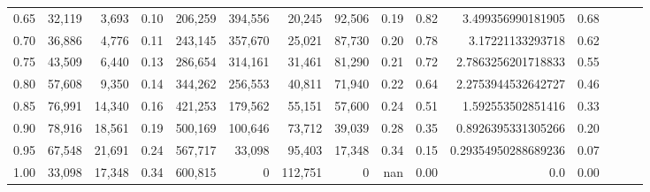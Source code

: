 \begin{tabular}{rrrrrrrrrrrrrrr}
0.65 &  32,119 &   3,693 &  0.10 &  206,259 &  394,556 &   20,245 &   92,506 &  0.19 &  0.82 &    3.499356990181905 &      0.68 \\
0.70 &  36,886 &   4,776 &  0.11 &  243,145 &  357,670 &   25,021 &   87,730 &  0.20 &  0.78 &     3.17221133293718 &      0.62 \\
0.75 &  43,509 &   6,440 &  0.13 &  286,654 &  314,161 &   31,461 &   81,290 &  0.21 &  0.72 &   2.7863256201718833 &      0.55 \\
0.80 &  57,608 &   9,350 &  0.14 &  344,262 &  256,553 &   40,811 &   71,940 &  0.22 &  0.64 &   2.2753944532642727 &      0.46 \\
0.85 &  76,991 &  14,340 &  0.16 &  421,253 &  179,562 &   55,151 &   57,600 &  0.24 &  0.51 &    1.592553502851416 &      0.33 \\
0.90 &  78,916 &  18,561 &  0.19 &  500,169 &  100,646 &   73,712 &   39,039 &  0.28 &  0.35 &   0.8926395331305266 &      0.20 \\
0.95 &  67,548 &  21,691 &  0.24 &  567,717 &   33,098 &   95,403 &   17,348 &  0.34 &  0.15 &  0.29354950288689236 &      0.07 \\
1.00 &  33,098 &  17,348 &  0.34 &  600,815 &        0 &  112,751 &        0 &   nan &  0.00 &                  0.0 &      0.00 \\
\bottomrule
\end{tabular}
